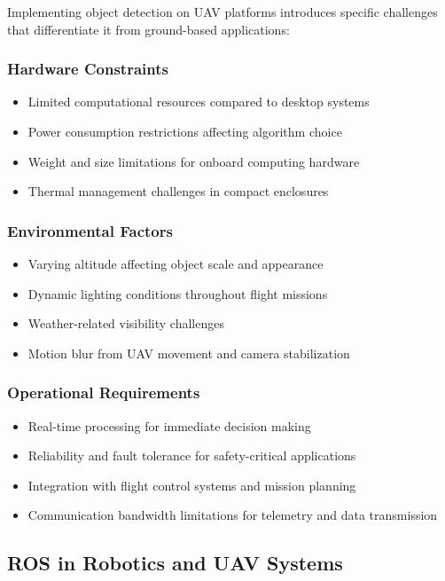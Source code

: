 \documentclass[11pt,a4paper]{article}
\begin{document}
Implementing object detection on UAV platforms introduces specific challenges that differentiate it from ground-based applications:

\subsubsection{Hardware Constraints}
\begin{itemize}
    \item Limited computational resources compared to desktop systems
    \item Power consumption restrictions affecting algorithm choice
    \item Weight and size limitations for onboard computing hardware
    \item Thermal management challenges in compact enclosures
\end{itemize}

\subsubsection{Environmental Factors}
\begin{itemize}
    \item Varying altitude affecting object scale and appearance
    \item Dynamic lighting conditions throughout flight missions
    \item Weather-related visibility challenges
    \item Motion blur from UAV movement and camera stabilization
\end{itemize}

\subsubsection{Operational Requirements}
\begin{itemize}
    \item Real-time processing for immediate decision making
    \item Reliability and fault tolerance for safety-critical applications
    \item Integration with flight control systems and mission planning
    \item Communication bandwidth limitations for telemetry and data transmission
\end{itemize}

\subsection{ROS in Robotics and UAV Systems}
\end{document}
